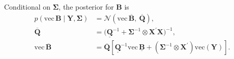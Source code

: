 \documentclass[\latexroot/\projectname]{subfiles}
\begin{document}
Conditional on $\boldsymbol{\Sigma}$, the posterior for $\boldsymbol{B}$ is
\begin{align}
p\!\left(\mathrm{vec}\,\boldsymbol{B}\mid \boldsymbol{Y}, \boldsymbol{\Sigma}\right)
&= \mathcal{N}\!\left(\mathrm{vec}\,\overline{\boldsymbol{B}},\ \overline{\boldsymbol{Q}}\right),\\
\overline{\boldsymbol{Q}}
&=\Big(\underline{\boldsymbol{Q}}^{-1}+\boldsymbol{\Sigma}^{-1}\otimes \boldsymbol{X}^\prime\boldsymbol{X}\Big)^{-1},\\
\mathrm{vec}\,\overline{\boldsymbol{B}}
&=\overline{\boldsymbol{Q}}\left[\underline{\boldsymbol{Q}}^{-1}\mathrm{vec}\,\underline{\boldsymbol{B}}
+\left(\boldsymbol{\Sigma}^{-1}\otimes \boldsymbol{X}^\prime\right)\mathrm{vec}(\boldsymbol{Y})\right].
\end{align}
\end{document}
